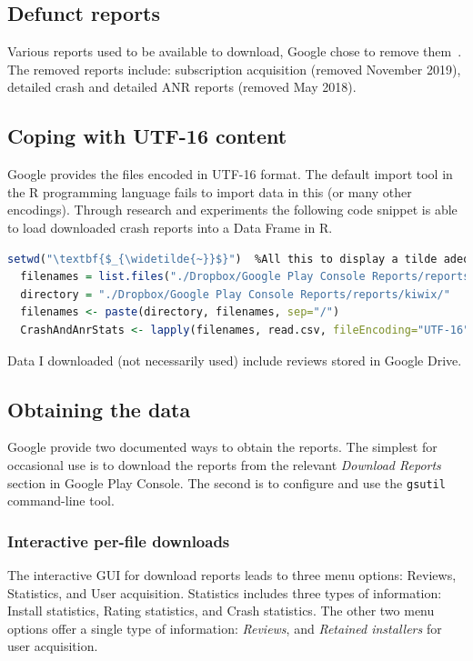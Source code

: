 \subsection{Defunct reports}
Various reports used to be available to download, Google chose to remove them~\citep{google_play_download_and_export_monthly_reports}. The removed reports include: subscription acquisition (removed November 2019), detailed crash and detailed ANR reports (removed May 2018).

\subsection{Coping with UTF-16 content}
Google provides the files encoded in UTF-16 format. The default import tool in the R programming language fails to import data in this (or many other encodings). Through research and experiments the following code snippet is able to load downloaded crash reports into a Data Frame in R.

\begin{lstlisting}[language=R, caption=Processing UTF-16 contents using R, label=listing=processing-utf-16-contents-in-r]
  setwd("\textbf{$_{\widetilde{~}}$}")  %All this to display a tilde adequately.
  filenames = list.files("./Dropbox/Google Play Console Reports/reports/kiwix/", pattern = ".csv")
  directory = "./Dropbox/Google Play Console Reports/reports/kiwix/"
  filenames <- paste(directory, filenames, sep="/")
  CrashAndAnrStats <- lapply(filenames, read.csv, fileEncoding="UTF-16")
\end{lstlisting}

Data I downloaded (not necessarily used) include reviews stored in Google Drive.

\subsection{Obtaining the data}
Google provide two documented ways to obtain the reports. The simplest for occasional use is to download the reports from the relevant \emph{Download Reports} section in Google Play Console. The second is to configure and use the \texttt{gsutil} command-line tool.

\subsubsection{Interactive per-file downloads}
The interactive GUI for download reports leads to three menu options: Reviews, Statistics, and User acquisition. Statistics includes three types of information: Install statistics, Rating statistics, and Crash statistics. The other two menu options offer a single type of information: \emph{Reviews}, and \emph{Retained installers} for user acquisition.

